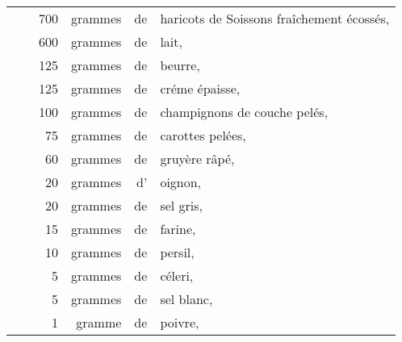 \footnotesize
\begin{longtable}{rrrrrp{18em}}
  & \hspace{2em} & 700 & grammes & de & haricots de Soissons fraîchement écossés,                         \\
  & \hspace{2em} & 600 & grammes & de & lait,                                                             \\
  & \hspace{2em} & 125 & grammes & de & beurre,                                                           \\
  & \hspace{2em} & 125 & grammes & de & créme épaisse,                                                    \\
  & \hspace{2em} & 100 & grammes & de & champignons de couche pelés,                                      \\
  & \hspace{2em} &  75 & grammes & de & carottes pelées,                                                  \\
  & \hspace{2em} &  60 & grammes & de & gruyère râpé,                                                     \\
  & \hspace{2em} &  20 & grammes & d' & oignon,                                                           \\
  & \hspace{2em} &  20 & grammes & de & sel gris,                                                         \\
  & \hspace{2em} &  15 & grammes & de & farine,                                                           \\
  & \hspace{2em} &  10 & grammes & de & persil,                                                           \\
  & \hspace{2em} &   5 & grammes & de & céleri,                                                           \\
  & \hspace{2em} &   5 & grammes & de & sel blanc,                                                        \\
  & \hspace{2em} &   1 & gramme  & de & poivre,                                                           \\

\end{longtable}
